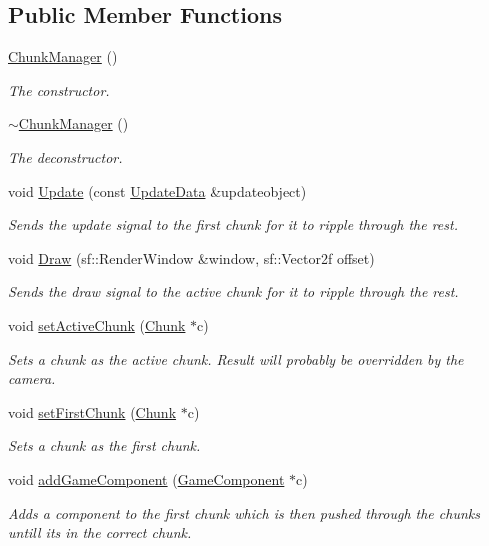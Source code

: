 \subsection*{Public Member Functions}
\begin{DoxyCompactItemize}
\item 
\hyperlink{class_chunk_manager_a5280c6347b5aa7f85660c66e3546bf87}{Chunk\-Manager} ()
\begin{DoxyCompactList}\small\item\em The constructor. \end{DoxyCompactList}\item 
\hyperlink{class_chunk_manager_a675cdb47d0529eee3c878fbc25406710}{$\sim$\-Chunk\-Manager} ()
\begin{DoxyCompactList}\small\item\em The deconstructor. \end{DoxyCompactList}\item 
void \hyperlink{class_chunk_manager_a1c6b1c312b12233d18c2bad68b933cdf}{Update} (const \hyperlink{class_update_data}{Update\-Data} \&updateobject)
\begin{DoxyCompactList}\small\item\em Sends the update signal to the first chunk for it to ripple through the rest. \end{DoxyCompactList}\item 
void \hyperlink{class_chunk_manager_a9cb7e15589f54b6937a2b12711403450}{Draw} (sf\-::\-Render\-Window \&window, sf\-::\-Vector2f offset)
\begin{DoxyCompactList}\small\item\em Sends the draw signal to the active chunk for it to ripple through the rest. \end{DoxyCompactList}\item 
void \hyperlink{class_chunk_manager_a00cea265f033fdc3b2188b1099094f08}{set\-Active\-Chunk} (\hyperlink{class_chunk}{Chunk} $\ast$c)
\begin{DoxyCompactList}\small\item\em Sets a chunk as the active chunk. Result will probably be overridden by the camera. \end{DoxyCompactList}\item 
void \hyperlink{class_chunk_manager_a0b4794622d5e281a55f9bc99950201dc}{set\-First\-Chunk} (\hyperlink{class_chunk}{Chunk} $\ast$c)
\begin{DoxyCompactList}\small\item\em Sets a chunk as the first chunk. \end{DoxyCompactList}\item 
void \hyperlink{class_chunk_manager_ac59d1f14da9114ebcce7cefa2bbcefc6}{add\-Game\-Component} (\hyperlink{class_game_component}{Game\-Component} $\ast$c)
\begin{DoxyCompactList}\small\item\em Adds a component to the first chunk which is then pushed through the chunks untill its in the correct chunk. \end{DoxyCompactList}\end{DoxyCompactItemize}
